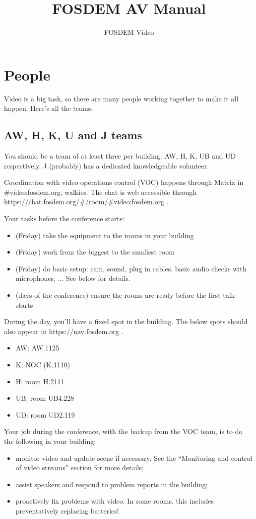\documentclass{article}
\title{FOSDEM AV Manual}
\author{FOSDEM Video}
\begin{document}
\maketitle \thispagestyle{empty}
\newpage

\tableofcontents
\newpage

\section{People}
Video is a big task, so there are many people working together to make it all happen. Here's all the teams:

\subsection{AW, H, K, U and J teams}
You should be a team of at least three per building: AW, H, K, UB and UD respectively. J (probably) has a dedicated knowledgeable volunteer.

Coordination with video operations control (VOC) happens through Matrix in \#video:fosdem.org, walkies. The chat is web accessible through https://chat.fosdem.org/\#/room/\#video:fosdem.org .

Your tasks before the conference starts:
\begin{itemize}
  \item (Friday) take the equipment to the rooms in your building
  \item (Friday) work from the biggest to the smallest room
  \item (Friday) do basic setup: cam, sound, plug in cables, basic audio checks with microphones, ... See below for details.
  \item (days of the conference) ensure the rooms are ready before the first talk starts
\end{itemize}

During the day, you'll have a fixed spot in the building. The below spots should also appear in https://nav.fosdem.org .
\begin{itemize}
  \item AW: AW.1125
  \item K: NOC (K.1110)
  \item H: room H.2111
  \item UB: room UB4.228
  \item UD: room UD2.119
\end{itemize}

Your job during the conference, with the backup from the VOC team, is to do the following in your building:
\begin{itemize}
  \item monitor video and update scene if necessary. See the ``Monitoring and control of video streams'' section for more details;
  \item assist speakers and respond to problem reports in the building;
  \item proactively fix problems with video. In some rooms, this includes preventatively replacing batteries!
\end{itemize}
\end{document}
